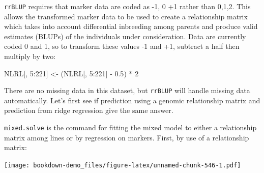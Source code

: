\documentclass[
]{book}
\newenvironment{Shaded}{\begin{snugshade}}{\end{snugshade}}
\newcommand{\AttributeTok}[1]{\textcolor[rgb]{0.77,0.63,0.00}{#1}}
\newcommand{\DecValTok}[1]{\textcolor[rgb]{0.00,0.00,0.81}{#1}}
\newcommand{\FloatTok}[1]{\textcolor[rgb]{0.00,0.00,0.81}{#1}}
\newcommand{\FunctionTok}[1]{\textcolor[rgb]{0.00,0.00,0.00}{#1}}
\newcommand{\NormalTok}[1]{#1}
\newcommand{\OtherTok}[1]{\textcolor[rgb]{0.56,0.35,0.01}{#1}}
\newcommand{\SpecialCharTok}[1]{\textcolor[rgb]{0.00,0.00,0.00}{#1}}
\begin{document}
\texttt{rrBLUP} requires that marker data are coded as -1, 0 +1 rather than 0,1,2. This allows the transformed marker data to be used to create a relationship matrix which takes into account differential inbreeding among parents and produce valid estimates (BLUPs) of the individuals under consideration. Data are currently coded 0 and 1, so to transform these values -1 and +1, subtract a half then multiply by two:

\begin{Shaded}
\begin{Highlighting}[]
\NormalTok{NLRL[, }\DecValTok{5}\SpecialCharTok{:}\DecValTok{221}\NormalTok{] }\OtherTok{\textless{}{-}}\NormalTok{ (NLRL[, }\DecValTok{5}\SpecialCharTok{:}\DecValTok{221}\NormalTok{] }\SpecialCharTok{{-}} \FloatTok{0.5}\NormalTok{) }\SpecialCharTok{*} \DecValTok{2}
\end{Highlighting}
\end{Shaded}

There are no missing data in this dataset, but \texttt{rrBLUP} will handle missing data automatically. Let's first see if prediction using a genomic relationship matrix and prediction from ridge regression give the same answer.

\texttt{mixed.solve} is the command for fitting the mixed model to either a relationship matrix
among lines or by regression on markers. First, by use of a relationship matrix:

\begin{Shaded}
\end{Shaded}

\texttt{[image: bookdown-demo\_files/figure-latex/unnamed-chunk-546-1.pdf]}

\begin{Shaded}
\end{Shaded}
\end{document}
